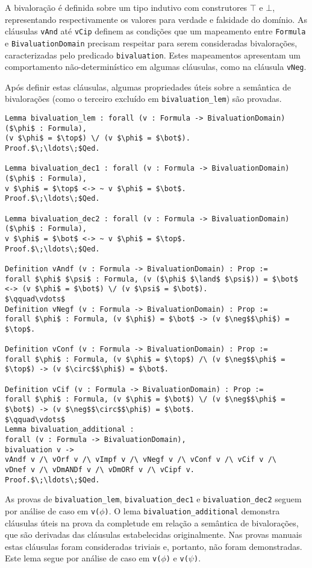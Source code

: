              A bivaloração é definida sobre um tipo indutivo com construtores $\top$ e $\bot$, representando respectivamente os valores para verdade e falsidade do domínio. As cláusulas \texttt{vAnd} até \texttt{vCip} definem as condições que um mapeamento entre \texttt{Formula} e \texttt{BivaluationDomain} precisam respeitar para serem consideradas bivalorações, caracterizadas pelo predicado \texttt{bivaluation}. Estes mapeamentos apresentam um comportamento não-determinístico em algumas cláusulas, como na cláusula \texttt{vNeg}.

              Após definir estas cláusulas, algumas propriedades úteis sobre a semântica de bivalorações (como o terceiro excluído em \texttt{bivaluation\_lem}) são provadas.

              \begin{lstlisting}[name=Semantics, frame=single, language=coq]
Lemma bivaluation_lem : forall (v : Formula -> BivaluationDomain) ($\phi$ : Formula),
(v $\phi$ = $\top$) \/ (v $\phi$ = $\bot$).
Proof.$\;\ldots\;$Qed.

Lemma bivaluation_dec1 : forall (v : Formula -> BivaluationDomain) ($\phi$ : Formula),
v $\phi$ = $\top$ <-> ~ v $\phi$ = $\bot$.
Proof.$\;\ldots\;$Qed.

Lemma bivaluation_dec2 : forall (v : Formula -> BivaluationDomain) ($\phi$ : Formula),
v $\phi$ = $\bot$ <-> ~ v $\phi$ = $\top$.
Proof.$\;\ldots\;$Qed.

Definition vAndf (v : Formula -> BivaluationDomain) : Prop :=
forall $\phi$ $\psi$ : Formula, (v ($\phi$ $\land$ $\psi$)) = $\bot$ <-> (v $\phi$ = $\bot$) \/ (v $\psi$ = $\bot$).
$\qquad\vdots$
Definition vNegf (v : Formula -> BivaluationDomain) : Prop :=
forall $\phi$ : Formula, (v $\phi$) = $\bot$ -> (v $\neg$$\phi$) = $\top$.

Definition vConf (v : Formula -> BivaluationDomain) : Prop :=
forall $\phi$ : Formula, (v $\phi$ = $\top$) /\ (v $\neg$$\phi$ = $\top$) -> (v $\circ$$\phi$) = $\bot$.

Definition vCif (v : Formula -> BivaluationDomain) : Prop :=
forall $\phi$ : Formula, (v $\phi$ = $\bot$) \/ (v $\neg$$\phi$ = $\bot$) -> (v $\neg$$\circ$$\phi$) = $\bot$.
$\qquad\vdots$
Lemma bivaluation_additional : 
forall (v : Formula -> BivaluationDomain),
bivaluation v ->
vAndf v /\ vOrf v /\ vImpf v /\ vNegf v /\ vConf v /\ vCif v /\
vDnef v /\ vDmANDf v /\ vDmORf v /\ vCipf v.
Proof.$\;\ldots\;$Qed.
            \end{lstlisting}
            As provas de \texttt{bivaluation\_lem}, \texttt{bivaluation\_dec1} e \texttt{bivaluation\_dec2} seguem por análise de caso em \texttt{v($\phi$)}. O lema \texttt{bivaluation\_additional} demonstra cláusulas úteis na prova da completude em relação a semântica de bivalorações, que são derivadas das cláusulas estabelecidas originalmente. Nas provas manuais estas cláusulas foram consideradas triviais e, portanto, não foram demonstradas. Este lema segue por análise de caso em \texttt{v($\phi$)} e \texttt{v($\psi$)}.


